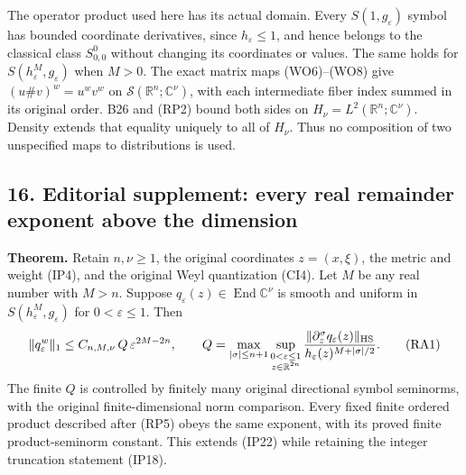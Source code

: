 \documentclass[
  11pt,
]{article}
\begin{document}
The operator product used here has its actual domain. Every
\(S(1,g_\varepsilon)\) symbol has bounded coordinate derivatives, since
\(h_\varepsilon\leq1\), and hence belongs to the classical class
\(S^0_{0,0}\) without changing its coordinates or values. The same holds
for \(S(h_\varepsilon^M,g_\varepsilon)\) when \(M>0\). The exact matrix
maps (WO6)--(WO8) give \((u\#v)^w=u^wv^w\) on
\(\mathcal S(\mathbb R^n;\mathbb C^\nu)\), with each intermediate fiber
index summed in its original order. B26 and (RP2) bound both sides on
\(H_\nu=L^2(\mathbb R^n;\mathbb C^\nu)\). Density extends that equality
uniquely to all of \(H_\nu\). Thus no composition of two unspecified
maps to distributions is used.

\subsection{16. Editorial supplement: every real remainder exponent
above the
dimension}\label{editorial-supplement-every-real-remainder-exponent-above-the-dimension}

\textbf{Theorem.} Retain \(n,\nu\geq1\), the original coordinates
\(z=(x,\xi)\), the metric and weight (IP4), and the original Weyl
quantization (CI4). Let \(M\) be any real number with \(M>n\). Suppose
\(q_\varepsilon(z)\in\operatorname{End}\mathbb C^\nu\) is smooth and
uniform in \(S(h_\varepsilon^M,g_\varepsilon)\) for
\(0<\varepsilon\leq1\). Then \[
 \|q_\varepsilon^w\|_1
      \leq C_{n,M,\nu}\,Q\,
             \varepsilon^{2M-2n},\qquad
 Q=\max_{|\sigma|\leq n+1}
       \sup_{\substack{0<\varepsilon\leq1\\z\in\mathbb R^{2n}}}
       {\|\partial_z^\sigma q_\varepsilon(z)\|_{\mathrm{HS}}
             \over h_\varepsilon(z)^{M+|\sigma|/2}}.
 \tag{RA1}
\] The finite \(Q\) is controlled by finitely many original directional
symbol seminorms, with the original finite-dimensional norm comparison.
Every fixed finite ordered product described after (RP5) obeys the same
exponent, with its proved finite product-seminorm constant. This extends
(IP22) while retaining the integer truncation statement (IP18).
\end{document}
